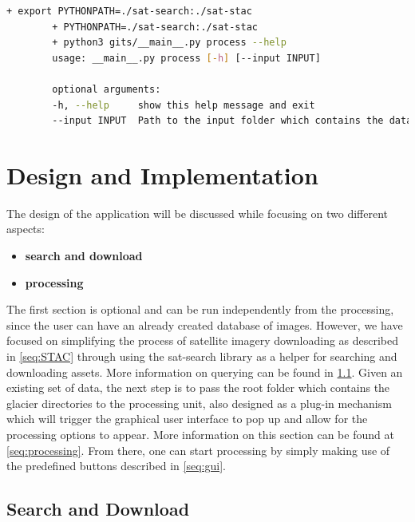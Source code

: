\documentclass[12pt, a4paper]{report}
\begin{document}
	\begin{lstlisting}[caption={Detailed parameters required for the download script.},label={lst:processhelp},language=Bash]
		+ export PYTHONPATH=./sat-search:./sat-stac
		+ PYTHONPATH=./sat-search:./sat-stac
		+ python3 gits/__main__.py process --help
		usage: __main__.py process [-h] [--input INPUT]
		
		optional arguments:
		-h, --help     show this help message and exit
		--input INPUT  Path to the input folder which contains the dataset of glaciers.
	\end{lstlisting}

	\newpage{}
	\chapter{Design and Implementation}
	\label{cha:design_and_implementation}
	
	\par The design of the application will be discussed while focusing on two different aspects:
	
	\begin{itemize}
		\item \textbf{search and download}
		\item \textbf{processing}
	\end{itemize}

	\par The first section is optional and can be run independently from the processing, since the user can have an already created database of images. However, we have focused on simplifying the process of satellite imagery downloading as described in \ref{seq:STAC} through using the sat-search library as a helper for searching and downloading assets. More information on querying can be found in \ref{seq:sd_implementation}. 
	Given an existing set of data, the next step is to pass the root folder which contains the glacier directories to the processing unit, also designed as a plug-in mechanism which will trigger the graphical user interface to pop up and allow for the processing options to appear. More information on this section can be found at \ref{seq:processing}. From there, one can start processing by simply making use of the predefined buttons described in \ref{seq:gui}.
	
		
	\section{Search and Download}
	\label{seq:sd_implementation}
		
\end{document}
